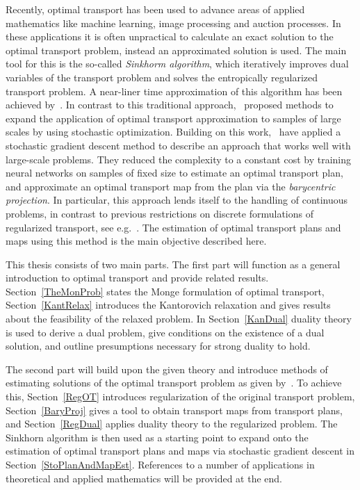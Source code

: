 Recently, optimal transport has been used to advance areas of applied mathematics like machine learning, image processing and auction processes. In these applications it is often unpractical to calculate an exact solution to the optimal transport problem, instead an approximated solution is used. The main tool for this is the so-called \textit{Sinkhorm algorithm}, which iteratively improves dual variables of the transport problem and solves the entropically regularized transport problem. A near-liner time approximation of this algorithm has been achieved by\ \cite{Alts2019}. In contrast to this traditional approach,\ \cite{Gene2016} proposed methods to expand the application of optimal transport approximation to samples of large scales by using stochastic optimization. Building on this work,\ \cite{Seg2018} have applied a stochastic gradient descent method to describe an approach that works well with large-scale problems. They reduced the complexity to a constant cost by training neural networks on samples of fixed size to estimate an optimal transport plan, and approximate an optimal transport map from the plan via the \textit{barycentric projection}. In particular, this approach lends itself to the handling of continuous problems, in contrast to previous restrictions on discrete formulations of regularized transport, see e.g.\ \cite{Ferra2013}. The estimation of optimal transport plans and maps using this method is the main objective described here.

This thesis consists of two main parts. The first part will function as a general introduction to optimal transport and provide related results. Section~\ref{TheMonProb} states the Monge formulation of optimal transport, Section~\ref{KantRelax} introduces the Kantorovich relaxation and gives results about the feasibility of the relaxed problem. In Section~\ref{KanDual} duality theory is used to derive a dual problem, give conditions on the existence of a dual solution, and outline presumptions necessary for strong duality to hold.

The second part will build upon the given theory and introduce methods of estimating solutions of the optimal transport problem as given by\ \cite{Seg2018}. To achieve this, Section~\ref{RegOT} introduces regularization of the original transport problem, Section~\ref{BaryProj} gives a tool to obtain transport maps from transport plans, and Section~\ref{RegDual} applies duality theory to the regularized problem. The Sinkhorn algorithm is then used as a starting point to expand onto the estimation of optimal transport plans and maps via stochastic gradient descent in Section~\ref{StoPlanAndMapEst}. References to a number of applications in theoretical and applied mathematics will be provided at the end.